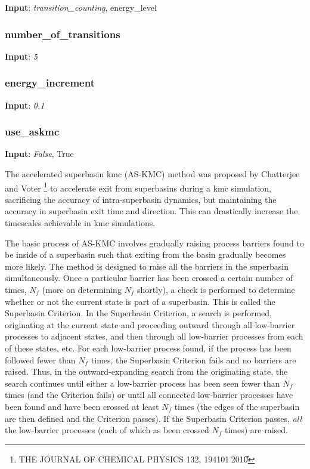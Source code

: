 \documentclass{article}
\begin{document}
\noindent\textbf{Input}:  \emph{transition\_counting}, energy\_level

\subsubsection{number\_of\_transitions}

\noindent\textbf{Input}:  \emph{5}

\subsubsection{energy\_increment}

\noindent\textbf{Input}:  \emph{0.1}

\subsubsection{use\_askmc}

\noindent\textbf{Input}:  \emph{False}, True

The accelerated superbasin kmc (AS-KMC) method was proposed by Chatterjee and Voter \footnote{THE JOURNAL OF CHEMICAL PHYSICS 132, 194101 ͑2010͒} to accelerate exit from superbasins during a kmc simulation, sacrificing the accuracy of intra-superbasin dynamics, but maintaining the accuracy in superbasin exit time and direction.  This can drastically increase the timescales achievable in kmc simulations.

The basic process of AS-KMC involves gradually raising process barriers found to be inside of a superbasin such that exiting from the basin gradually becomes more likely.  The method is designed to raise all the barriers in the superbasin simultaneously.  Once a particular barrier has been crossed a certain number of times, $N_f$ (more on determining $N_f$ shortly), a check is performed to determine whether or not the current state is part of a superbasin.  This is called the Superbasin Criterion.  In the Superbasin Criterion, a search is performed, originating at the current state and proceeding outward through all low-barrier processes to adjacent states, and then through all low-barrier processes from each of these states, etc.  For each low-barrier process found, if the process has been followed fewer than $N_f$ times, the Superbasin Criterion fails and no barriers are raised.  Thus, in the outward-expanding search from the originating state, the search continues until either a low-barrier process has been seen fewer than $N_f$ times (and the Criterion fails) or until all connected low-barrier processes have been found and have been crossed at least $N_f$ times (the edges of the superbasin are then defined and the Criterion passes).  If the Superbasin Criterion  passes, \emph{all} the low-barrier processes (each of which as been crossed $N_f$ times) are raised.
\end{document}
